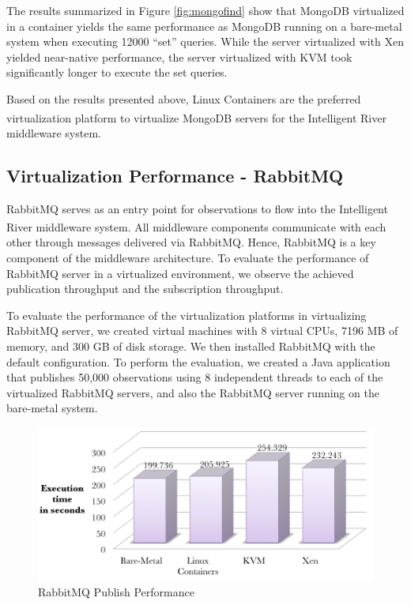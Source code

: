 The results summarized in Figure \ref{fig:mongofind} show that MongoDB virtualized in a container yields the same performance as MongoDB running on a bare-metal system when executing 12000 ``set'' queries. While the server virtualized with Xen yielded near-native performance, the server virtualized with KVM took significantly longer to execute the set queries. 

Based on the results presented above, Linux Containers are the preferred virtualization platform to virtualize MongoDB servers for the Intelligent River\textsuperscript{\textregistered} middleware system.

\subsection{Virtualization Performance - RabbitMQ}

RabbitMQ serves as an entry point for observations to flow into the Intelligent River\textsuperscript{\textregistered} middleware system. All middleware components communicate with each other through messages delivered via RabbitMQ. Hence, RabbitMQ is a key component of the middleware architecture. To evaluate the performance of RabbitMQ server in a virtualized environment, we observe the achieved publication throughput and the subscription throughput.

To evaluate the performance of the virtualization platforms in virtualizing RabbitMQ server, we created virtual machines with 8 virtual CPUs, 7196 MB of memory, and 300 GB of disk storage. We then installed RabbitMQ with the default configuration. To perform the evaluation, we created a Java application that publishes 50,000 observations using 8 independent threads to each of the virtualized RabbitMQ servers, and also the RabbitMQ server running on the bare-metal system.
 
\begin{figure}[H]
\centering
\includegraphics[width=150mm]{rabbitpub.png}
\caption{RabbitMQ Publish Performance}
\label{fig:rabbitpub}
\end{figure}

